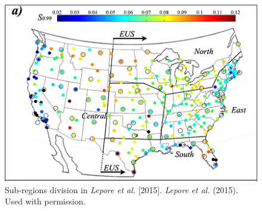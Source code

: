 \begin{figure}[htbp]
	\includegraphics[width=\linewidth]{pics/ch4/figS6.png}
	\caption{Sub-regions division in \textit{Lepore et al.} [2015]. \textcopyright \textit{Lepore et al.} (2015). Used with permission.}
	\label{fig:4-S6}
\end{figure}